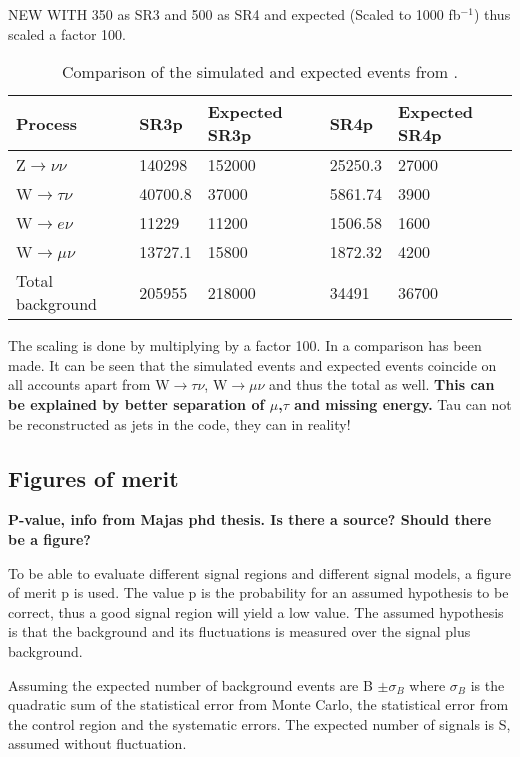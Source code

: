 NEW WITH 350 as SR3 and 500 as SR4 and expected (Scaled to 1000 fb$^{-1}$) thus scaled a factor 100.
\begin{table}[ht]
\begin{center}
\begin{tabular}{|l|l|l|l|l|}
\hline
Process & SR3p & Expected SR3p & SR4p  & Expected SR4p \\ \hline
Z$\rightarrow\nu\nu$&140298&152000&25250.3&27000 \\
W$\rightarrow\tau\nu$&40700.8&37000&5861.74&3900 \\
W$\rightarrow e\nu$&11229&11200&1506.58&1600 \\
W$\rightarrow\mu\nu$&13727.1&15800&1872.32&4200 \\ \hline
Total background&205955&218000&34491&36700 \\ \hline
\end{tabular}
\caption{Comparison of the simulated and expected events from \citep{ATLAS-CONF-2012-147}.}
\label{tab:Compare1}
\end{center}
\end{table}

The scaling is done by multiplying by a factor 100.
In  a comparison has been made. It can be seen that the simulated events and expected events coincide on all accounts apart from W$\rightarrow\tau\nu$, W$\rightarrow\mu\nu$ and thus the total as well. \textbf{This can be explained by better separation of $\mu$,$\tau$ and missing energy.} 
Tau can not be reconstructed as jets in the code, they can in reality!

\subsection{Figures of merit}
\textbf{P-value, info from Majas phd thesis. Is there a source? Should there be a figure?}

To be able to evaluate different signal regions and different signal models, a figure of merit p is used. The value p is the probability for an assumed hypothesis to be correct, thus a good signal region will yield a low value. The assumed hypothesis is that the background and its fluctuations is measured over the signal plus background.

Assuming the expected number of background events are B $\pm \sigma_B$ where $\sigma_B$ is the quadratic sum of the statistical error from Monte Carlo, the statistical error from the control region and the systematic errors. The expected number of signals is S, assumed without fluctuation. 

